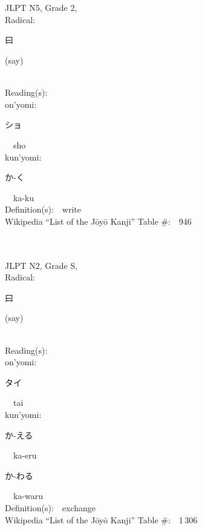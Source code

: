 \begin{multicols}{2}
\ \ \\
{\fontsize{34pt}{40pt}  }\ \ \\  %
{JLPT N5, Grade 2, \\Radical:\ \ {\begin{CJK}{UTF8}{min} 曰 \end{CJK}} (say) } \\
Reading(s):\ \ \\
{\hspace*{1em}}on'yomi:\ \ \\
{\hspace*{2em}}{\begin{CJK}{UTF8}{min} ショ \end{CJK}}\ \ sho\ \ \\
{\hspace*{1em}}kun'yomi:\ \ \\
{\hspace*{2em}}{\begin{CJK}{UTF8}{min} か-く \end{CJK}}\ \ ka-ku\ \ \\
Definition(s):\ \ write \\
Wikipedia ``List of the J\=oy\=o Kanji'' Table \#:\ \ 946 \\
\ \ \\
{\fontsize{34pt}{40pt}  }\ \ \\  %
{JLPT N2, Grade S, \\Radical:\ \ {\begin{CJK}{UTF8}{min} 曰 \end{CJK}} (say) } \\
Reading(s):\ \ \\
{\hspace*{1em}}on'yomi:\ \ \\
{\hspace*{2em}}{\begin{CJK}{UTF8}{min} タイ \end{CJK}}\ \ tai\ \ \\
{\hspace*{1em}}kun'yomi:\ \ \\
{\hspace*{2em}}{\begin{CJK}{UTF8}{min} か-える \end{CJK}}\ \ ka-eru\ \ \\
{\hspace*{2em}}{\begin{CJK}{UTF8}{min} か-わる \end{CJK}}\ \ ka-waru\ \ \\
Definition(s):\ \ exchange \\
Wikipedia ``List of the J\=oy\=o Kanji'' Table \#:\ \ 1\,306 \\
\ \ \\
\end{multicols}


